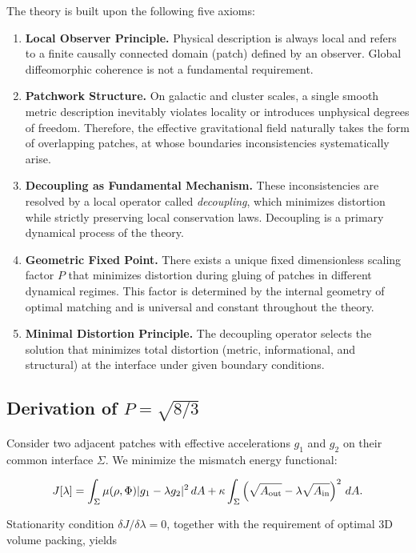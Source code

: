 \documentclass[12pt,a4paper]{article}
\begin{document}
The theory is built upon the following five axioms:

\begin{enumerate}
\item \textbf{Local Observer Principle.} Physical description is always local and refers to a finite causally connected domain (patch) defined by an observer. Global diffeomorphic coherence is not a fundamental requirement.
\item \textbf{Patchwork Structure.} On galactic and cluster scales, a single smooth metric description inevitably violates locality or introduces unphysical degrees of freedom. Therefore, the effective gravitational field naturally takes the form of overlapping patches, at whose boundaries inconsistencies systematically arise.
\item \textbf{Decoupling as Fundamental Mechanism.} These inconsistencies are resolved by a local operator called \emph{decoupling}, which minimizes distortion while strictly preserving local conservation laws. Decoupling is a primary dynamical process of the theory.
\item \textbf{Geometric Fixed Point.} There exists a unique fixed dimensionless scaling factor \(P\) that minimizes distortion during gluing of patches in different dynamical regimes. This factor is determined by the internal geometry of optimal matching and is universal and constant throughout the theory.
\item \textbf{Minimal Distortion Principle.} The decoupling operator selects the solution that minimizes total distortion (metric, informational, and structural) at the interface under given boundary conditions.
\end{enumerate}

\subsection{Derivation of \( P = \sqrt{8/3} \)}

Consider two adjacent patches with effective accelerations \(g_1\) and \(g_2\) on their common interface \(\Sigma\). We minimize the mismatch energy functional:

\begin{equation}
J[\lambda] = \int_{\Sigma} \mu(\rho,\Phi) |g_1 - \lambda g_2|^2 \, dA 
+ \kappa \int_{\Sigma} \left( \sqrt{A_{\rm out}} - \lambda \sqrt{A_{\rm in}} \right)^2 \, dA.
\end{equation}

Stationarity condition \(\delta J / \delta\lambda = 0\), together with the requirement of optimal 3D volume packing, yields
\end{document}
